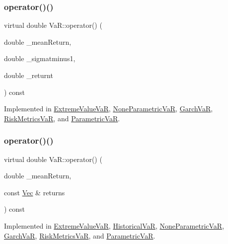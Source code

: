\subsubsection{\texorpdfstring{operator()()}{operator()()}\hspace{0.1cm}{\footnotesize\ttfamily [1/3]}}
{\footnotesize\ttfamily virtual double Va\+R\+::operator() (\begin{DoxyParamCaption}\item[{double}]{\+\_\+mean\+Return,  }\item[{double}]{\+\_\+sigmatminus1,  }\item[{double}]{\+\_\+returnt }\end{DoxyParamCaption}) const\hspace{0.3cm}{\ttfamily [pure virtual]}}



Implemented in \hyperlink{classExtremeValueVaR_ad6d31417001a3ee1b75592806d21ae8b}{Extreme\+Value\+VaR}, \hyperlink{classNoneParametricVaR_ab22e4237802535880a932097aeaf003b}{None\+Parametric\+VaR}, \hyperlink{classGarchVaR_a6aec8c89e48d2b2f356669ed3300f456}{Garch\+VaR}, \hyperlink{classRiskMetricsVaR_a801fc34d2327f8fffc1315a5a9aa9df1}{Risk\+Metrics\+VaR}, and \hyperlink{classParametricVaR_a54589e13bb45da786d574656eb67b5fb}{Parametric\+VaR}.

\hypertarget{classVaR_a31cb62626488715a9133679feaba31e5}{}\label{classVaR_a31cb62626488715a9133679feaba31e5} 
\subsubsection{\texorpdfstring{operator()()}{operator()()}\hspace{0.1cm}{\footnotesize\ttfamily [2/3]}}
{\footnotesize\ttfamily virtual double Va\+R\+::operator() (\begin{DoxyParamCaption}\item[{double}]{\+\_\+mean\+Return,  }\item[{const \hyperlink{compute__returns__eigen_8h_a1eb6a9306ef406d7975f3cbf2e247777}{Vec} \&}]{returns }\end{DoxyParamCaption}) const\hspace{0.3cm}{\ttfamily [pure virtual]}}



Implemented in \hyperlink{classExtremeValueVaR_a8dfe4d515f7e4d0260b3ac87c1a52b5f}{Extreme\+Value\+VaR}, \hyperlink{classHistoricalVaR_a472b04dc9a4c5989be0e7198bc9c4189}{Historical\+VaR}, \hyperlink{classNoneParametricVaR_a958aae1b9bc03a8ef87295df30db76f7}{None\+Parametric\+VaR}, \hyperlink{classGarchVaR_ab7e9583566b26a64017edbbfb63f3e89}{Garch\+VaR}, \hyperlink{classRiskMetricsVaR_ab83bde7047dc8e501b8e8ea115cf5e7b}{Risk\+Metrics\+VaR}, and \hyperlink{classParametricVaR_a5fda9d0e1033ff6e93dd112555ee5e0b}{Parametric\+VaR}.

